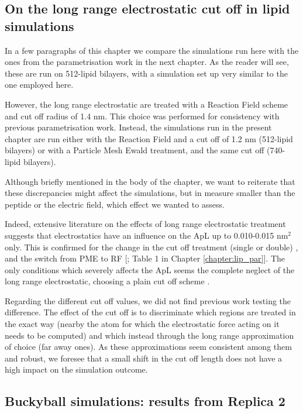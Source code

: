 \subsection{On the long range electrostatic cut off in lipid simulations}
In a few paragraphs of this chapter we compare the simulations run here with the ones from the parametrisation work in the next chapter. As the reader will see, these are run on 512-lipid bilayers, with a simulation set up very similar to the one employed here.

However, the long range electrostatic are treated with a Reaction Field scheme and cut off radius of 1.4 nm. This choice was performed for consistency with previous parametrisation work.
%
Instead, the simulations run in the present chapter are run either with the Reaction Field and a cut off of 1.2 nm (512-lipid bilayers) or with a Particle Mesh Ewald treatment, and the same cut off (740-lipid bilayers).

Although briefly mentioned in the body of the chapter, we want to reiterate that these discrepancies might affect the simulations, but in measure smaller than the peptide or the electric field, which effect we wanted to assess.

Indeed, extensive literature on the effects of long range electrostatic treatment suggests that electrostatics have an influence on the ApL up to 0.010-0.015 nm$^2$ only. This is confirmed for the change in the cut off treatment (single or double) \citep{Silva2018,Reisser2017}, and the switch from PME to RF [\citet{Poger2012}; Table 1 in Chapter \ref{chapter:lip_par}].
%
The only conditions which severely affects the ApL seems the complete neglect of the long range electrostatic, choosing a plain cut off scheme \citep{Patra2003}.

Regarding the different cut off values, we did not find previous work testing the difference. The effect of the cut off is to discriminate which regions are treated in the exact way (nearby the atom for which the electrostatic force acting on it needs to be computed) and which instead through the long range approximation of choice (far away ones). As these approximations seem consistent among them and robust, we foresee that a small shift in the cut off length does not have a high impact on the simulation outcome.


\subsection{Buckyball simulations: results from Replica 2}

